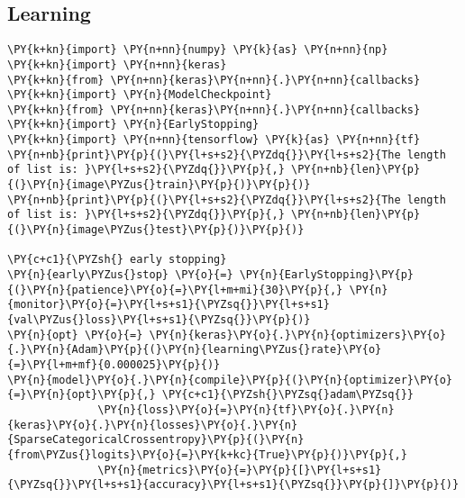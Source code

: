\subsection{Learning}

    \begin{tcolorbox}[breakable, size=fbox, boxrule=1pt, pad at break*=1mm,colback=cellbackground, colframe=cellborder]
\begin{Verbatim}[commandchars=\\\{\}]
\PY{k+kn}{import} \PY{n+nn}{numpy} \PY{k}{as} \PY{n+nn}{np}
\PY{k+kn}{import} \PY{n+nn}{keras}
\PY{k+kn}{from} \PY{n+nn}{keras}\PY{n+nn}{.}\PY{n+nn}{callbacks} \PY{k+kn}{import} \PY{n}{ModelCheckpoint}
\PY{k+kn}{from} \PY{n+nn}{keras}\PY{n+nn}{.}\PY{n+nn}{callbacks} \PY{k+kn}{import} \PY{n}{EarlyStopping}
\PY{k+kn}{import} \PY{n+nn}{tensorflow} \PY{k}{as} \PY{n+nn}{tf}
\PY{n+nb}{print}\PY{p}{(}\PY{l+s+s2}{\PYZdq{}}\PY{l+s+s2}{The length of list is: }\PY{l+s+s2}{\PYZdq{}}\PY{p}{,} \PY{n+nb}{len}\PY{p}{(}\PY{n}{image\PYZus{}train}\PY{p}{)}\PY{p}{)}
\PY{n+nb}{print}\PY{p}{(}\PY{l+s+s2}{\PYZdq{}}\PY{l+s+s2}{The length of list is: }\PY{l+s+s2}{\PYZdq{}}\PY{p}{,} \PY{n+nb}{len}\PY{p}{(}\PY{n}{image\PYZus{}test}\PY{p}{)}\PY{p}{)}

\PY{c+c1}{\PYZsh{} early stopping}
\PY{n}{early\PYZus{}stop} \PY{o}{=} \PY{n}{EarlyStopping}\PY{p}{(}\PY{n}{patience}\PY{o}{=}\PY{l+m+mi}{30}\PY{p}{,} \PY{n}{monitor}\PY{o}{=}\PY{l+s+s1}{\PYZsq{}}\PY{l+s+s1}{val\PYZus{}loss}\PY{l+s+s1}{\PYZsq{}}\PY{p}{)}
\PY{n}{opt} \PY{o}{=} \PY{n}{keras}\PY{o}{.}\PY{n}{optimizers}\PY{o}{.}\PY{n}{Adam}\PY{p}{(}\PY{n}{learning\PYZus{}rate}\PY{o}{=}\PY{l+m+mf}{0.000025}\PY{p}{)}
\PY{n}{model}\PY{o}{.}\PY{n}{compile}\PY{p}{(}\PY{n}{optimizer}\PY{o}{=}\PY{n}{opt}\PY{p}{,} \PY{c+c1}{\PYZsh{}\PYZsq{}adam\PYZsq{}}
              \PY{n}{loss}\PY{o}{=}\PY{n}{tf}\PY{o}{.}\PY{n}{keras}\PY{o}{.}\PY{n}{losses}\PY{o}{.}\PY{n}{SparseCategoricalCrossentropy}\PY{p}{(}\PY{n}{from\PYZus{}logits}\PY{o}{=}\PY{k+kc}{True}\PY{p}{)}\PY{p}{,}
              \PY{n}{metrics}\PY{o}{=}\PY{p}{[}\PY{l+s+s1}{\PYZsq{}}\PY{l+s+s1}{accuracy}\PY{l+s+s1}{\PYZsq{}}\PY{p}{]}\PY{p}{)}


\end{Verbatim}
\end{tcolorbox}
